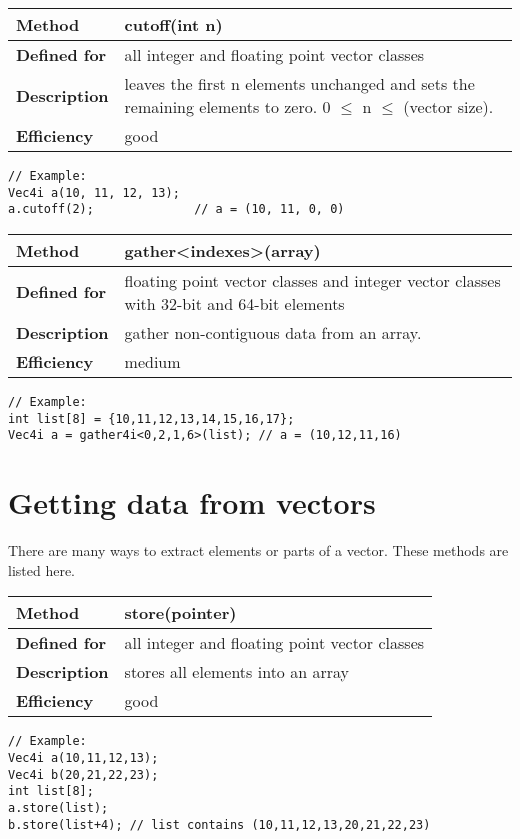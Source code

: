 \documentclass[vcl_manual.tex]{subfiles}
\begin{document}
\begin{tabular}{|p{25mm}|p{100mm}|}
\hline
\bfseries Method & cutoff(int n) \\ \hline
\bfseries Defined for & all integer and floating point vector classes \\ \hline
\bfseries Description & leaves the first n elements unchanged and sets the remaining elements to zero. 0 $\leq$ n $\leq$ (vector size). \\ \hline
\bfseries Efficiency & good \\ \hline
\end{tabular}
\begin{lstlisting}[frame=none]
// Example:
Vec4i a(10, 11, 12, 13);
a.cutoff(2);              // a = (10, 11, 0, 0)
\end{lstlisting}


\begin{tabular}{|p{25mm}|p{100mm}|}
\hline
\bfseries Method & gather\textless indexes\textgreater (array) \\ \hline
\bfseries Defined for & floating point vector classes and integer vector classes with 32-bit and 64-bit elements \\ \hline
\bfseries Description & gather non-contiguous data from an array. \\ \hline
\bfseries Efficiency & medium \\ \hline
\end{tabular}
\begin{lstlisting}[frame=none]
// Example:
int list[8] = {10,11,12,13,14,15,16,17};
Vec4i a = gather4i<0,2,1,6>(list); // a = (10,12,11,16)
\end{lstlisting}

\section{Getting data from vectors} \label{GettingDataFromVectors}

There are many ways to extract elements or parts of a vector. These methods are listed here.

\begin{tabular}{|p{25mm}|p{100mm}|}
\hline
\bfseries Method & store(pointer) \\ \hline
\bfseries Defined for & all integer and floating point vector classes \\ \hline
\bfseries Description & stores all elements into an array \\ \hline
\bfseries Efficiency & good \\ \hline
\end{tabular}
\begin{lstlisting}[frame=none]
// Example:
Vec4i a(10,11,12,13);
Vec4i b(20,21,22,23);
int list[8];
a.store(list);
b.store(list+4); // list contains (10,11,12,13,20,21,22,23)
\end{lstlisting}
\end{document}
